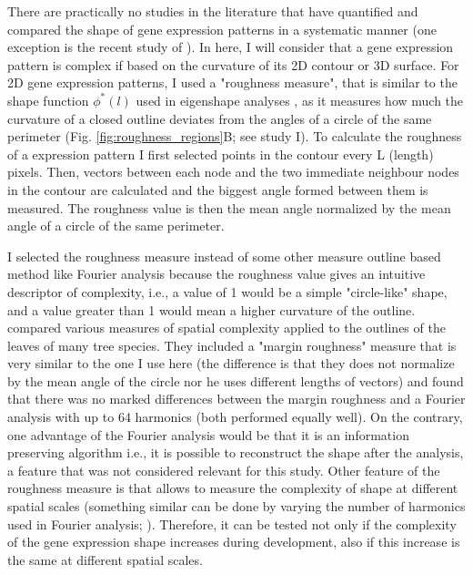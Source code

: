 There are practically no studies in the literature that have quantified and compared the shape of gene expression patterns in a systematic manner (one exception is the recent study of \citealp{Martinez-Abadias2016}). In here, I will consider that a gene expression pattern is complex if based on the curvature of its 2D contour or 3D surface.
For 2D gene expression patterns, I used a "roughness measure", that is similar to the shape function $\phi^{*}(l)$ used in eigenshape analyses \citep{Lohmann1983}, as it measures how much the curvature of a closed outline deviates from the angles of a circle of the same perimeter (Fig. \ref{fig:roughness_regions}B; see study I). 
To calculate the roughness of a expression pattern I first selected points in the contour every L (length) pixels. Then, vectors between each node and the two immediate neighbour nodes in the contour are calculated and the biggest angle formed between them is measured. The roughness value is then the mean angle normalized by the mean angle of a circle of the same perimeter.

I selected the roughness measure instead of some other measure outline based method like Fourier analysis because the roughness value gives an intuitive descriptor of complexity, i.e., a value of 1 would be a simple "circle-like" shape, and a value greater than 1 would mean a higher curvature of the outline. \citet{McLellan1998} compared various measures of spatial complexity applied to the outlines of the leaves of many tree species. They included a "margin roughness" measure that is very similar to the one I use here (the difference is that they does not normalize by the mean angle of the circle nor he uses different lengths of vectors) and found that there was no marked differences between the margin roughness and a Fourier analysis with up to 64 harmonics (both performed equally well).
On the contrary, one advantage of the Fourier analysis would be that it is an information preserving algorithm \citep{Pavlidis1980} i.e., it is possible to reconstruct the shape after the analysis, a feature that was not considered relevant for this study. Other feature of the roughness measure is that allows to measure the complexity of shape at different spatial scales (something similar can be done by varying the number of harmonics used in Fourier analysis; \citealp{McLellan1998}). Therefore, it can be tested not only if the complexity of the gene expression shape increases during development, also if this increase is the same at different spatial scales.

